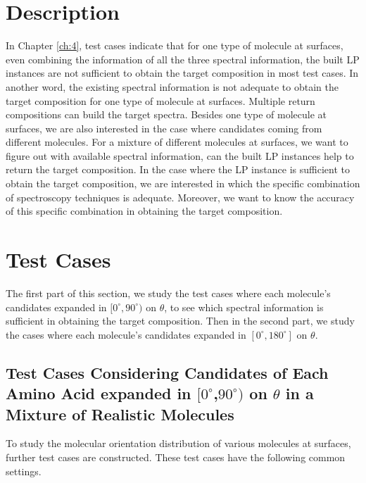  \label{ch:5}
\section{Description}

In Chapter \ref{ch:4}, test cases indicate that for one type of molecule at surfaces, even combining the information of all the three spectral information, the built LP instances are not sufficient to obtain the target composition in most test cases. In another word, the existing spectral information is not adequate to obtain the target composition for one type of molecule at surfaces. Multiple return compositions can build the target spectra. Besides one type of molecule at surfaces, we are also interested in the case where candidates coming from different molecules. For a mixture of different molecules at surfaces, we want to figure out with available spectral information, can the built LP instances help to return the target composition. In the case where the LP instance is sufficient to obtain the target composition, we are interested in which the specific combination of spectroscopy techniques is adequate. Moreover, we want to know the accuracy of this specific combination in obtaining the target composition. \\

\section{Test Cases}
The first part of this section, we study the test cases where each molecule's candidates expanded in $[0^{\circ}, 90^{\circ})$ on $\theta$, to see which spectral information is sufficient in obtaining the target composition. Then in the second part, we study the cases where each molecule's candidates expanded in $[0^{\circ}, 180^{\circ}]$ on $\theta$. \\

\subsection{Test Cases Considering Candidates of Each Amino Acid expanded in $[0^{\circ}$,$90^{\circ})$ on $\theta$ in a Mixture of Realistic Molecules} \label{testcase51}
To study the molecular orientation distribution of various molecules at surfaces, further test cases are constructed. These test cases have the following common settings. \\

